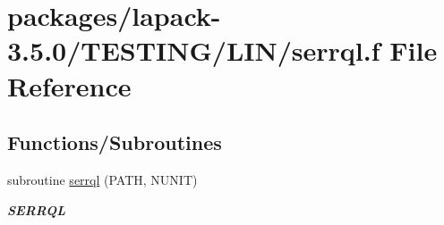\hypertarget{serrql_8f}{}\section{packages/lapack-\/3.5.0/\+T\+E\+S\+T\+I\+N\+G/\+L\+I\+N/serrql.f File Reference}
\label{serrql_8f}
\subsection*{Functions/\+Subroutines}
\begin{DoxyCompactItemize}
\item 
subroutine \hyperlink{group__single__lin_ga23dc8f8edb586d9cc6a97a83f3bbc843}{serrql} (P\+A\+T\+H, N\+U\+N\+I\+T)
\begin{DoxyCompactList}\small\item\em {\bfseries S\+E\+R\+R\+Q\+L} \end{DoxyCompactList}\end{DoxyCompactItemize}
